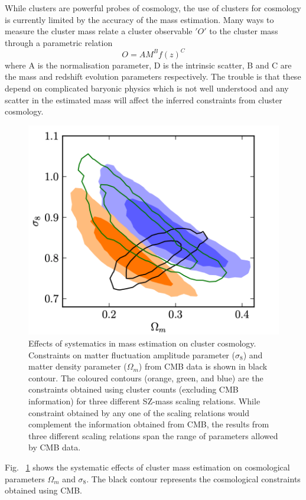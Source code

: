 While clusters are powerful probes of cosmology, the use of clusters for cosmology is currently limited by the accuracy of the mass estimation. Many ways to measure the cluster mass relate a cluster observable $'O'$ to the cluster mass through a parametric relation 
\begin{equation}
O = A M^{B} f(z)^{C} 
\label{obs-mass}
\end{equation} 
where A is the normalisation parameter, D is the intrinsic scatter, B and C are the mass and redshift evolution parameters respectively. The trouble is that these depend on complicated baryonic physics which is not well understood and any scatter in the estimated mass will affect the inferred constraints from cluster cosmology. 
\begin{figure}[H]
\includegraphics[width = \columnwidth]{figs/mass_cosmology.png}
\caption{Effects of systematics in mass estimation on cluster cosmology. Constraints on matter fluctuation amplitude parameter ($\sigma_{8}$) and matter density parameter ($\Omega_{m}$) from CMB data is shown in black contour. The coloured contours (orange, green, and blue) are the constraints obtained using cluster counts (excluding CMB information) for three different SZ-mass scaling relations. While constraint obtained by any one of the scaling relations would complement the information obtained from CMB, the results from three different scaling relations span the range of parameters allowed by CMB data. }
\label{m_cosmo}
\end{figure}
Fig. ~\ref{m_cosmo} shows the systematic effects of cluster mass estimation on cosmological parameters $\Omega_{m}$ and $\sigma_{8}$. The black contour represents the cosmological constraints obtained using CMB.
